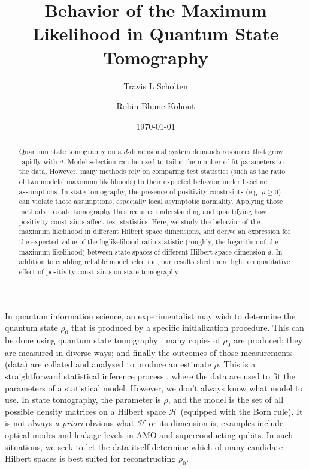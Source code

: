 \documentclass[aps,pra, twocolumn]{revtex4-1}
\newcommand{\cH}{\mathcal{H}}
\newcommand{\rhohat}{\hat{\rho}}
\begin{document}
\author{Travis L Scholten}
\author{Robin Blume-Kohout}

\title{Behavior of the Maximum Likelihood in Quantum State Tomography}

\begin{abstract}
Quantum state tomography on a $d$-dimensional system demands resources that grow rapidly with $d$. Model selection can be used to tailor the number of fit parameters to the data.  However, many methods rely on comparing test statistics (such as the ratio of two models' maximum likelihoods) to their expected behavior under baseline assumptions.  In state tomography, the presence of positivity constraints (e.g. $\rho\geq0$) can violate those assumptions, especially local asymptotic normality.  Applying those methods to state tomography thus requires understanding and quantifying how positivity constraints affect test statistics.  Here, we study the behavior of the maximum likelihood in different Hilbert space dimensions, and derive an expression for the expected value of the loglikelihood ratio statistic (roughly, the logarithm of the maximum likelihood) between  state spaces of different Hilbert space dimension $d$.  In addition to enabling reliable model selection, our results shed more light on qualitative effect of positivity constraints on state tomography.
\end{abstract}
\date{\today}

\maketitle


 In quantum information science, an experimentalist may wish to determine the quantum state $\rho_{0}$ that is produced by a specific initialization procedure.  This can be done using quantum state tomography \cite{Paris2004}:  many copies of $\rho_{0}$ are produced; they are measured in diverse ways; and finally the outcomes of those measurements (data) are collated and analyzed to produce an estimate $\rhohat$.  This is a straightforward statistical inference process \cite{Reid2015, Wasserman2004}, where the data are used to fit the parameters of a statistical model.  However, we don't always know what model to use.  In state tomography, the parameter is $\rho$, and the model is the set of all possible density matrices on a Hilbert space $\cH$ (equipped with the Born rule). It is not always \emph{a priori} obvious what $\cH$ or its dimension is; examples include optical modes \cite{Altepeter2005, Bertrand1987, Lvovsky2009, Breitenbach1997, Leonhardt1995} and leakage levels in AMO and superconducting \cite{Motzoi2009, Fazio1999} qubits. In such situations, we seek to let the data itself determine which of many candidate Hilbert spaces is best suited for reconstructing $\rho_{0}$.
\end{document}
